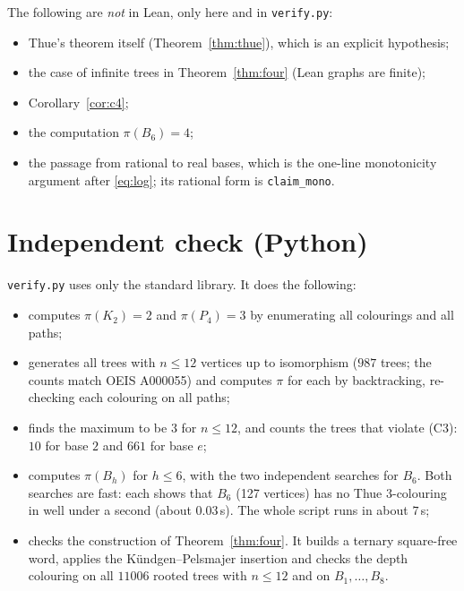 \documentclass[11pt]{article}
\theoremstyle{definition}
\theoremstyle{remark}
\begin{document}
The following are \emph{not} in Lean, only here and in \texttt{verify.py}:
\begin{itemize}
\item Thue's theorem itself (Theorem~\ref{thm:thue}), which is an explicit hypothesis;
\item the case of infinite trees in Theorem~\ref{thm:four} (Lean graphs are finite);
\item Corollary~\ref{cor:c4};
\item the computation $\pi(B_6)=4$;
\item the passage from rational to real bases, which is the one-line monotonicity argument after
\eqref{eq:log}; its rational form is \texttt{claim\_mono}.
\end{itemize}

\section{Independent check (Python)}

\texttt{verify.py} uses only the standard library. It does the following:
\begin{itemize}
\item computes $\pi(K_2)=2$ and $\pi(P_4)=3$ by enumerating all colourings and all paths;
\item generates all trees with $n\le12$ vertices up to isomorphism ($987$ trees; the counts match
OEIS A000055) and computes $\pi$ for each by backtracking, re-checking each colouring on all
paths;
\item finds the maximum to be $3$ for $n\le12$, and counts the trees that violate (C3): $10$ for
base $2$ and $661$ for base $e$;
\item computes $\pi(B_h)$ for $h\le6$, with the two independent searches for $B_6$. Both
searches are fast: each shows that $B_6$ (127 vertices) has no Thue $3$-colouring in well under
a second (about $0.03$\,s). The whole script runs in about $7$\,s;
\item checks the construction of Theorem~\ref{thm:four}. It builds a ternary square-free word,
applies the K\"undgen--Pelsmajer insertion and checks the depth colouring on all $11006$ rooted
trees with $n\le12$ and on $B_1,\dots,B_8$.
\end{itemize}
\end{document}
